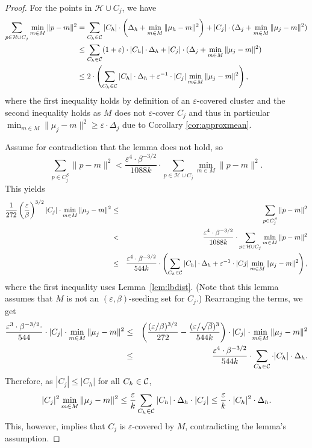 \documentclass[11pt]{article}
\begin{document}
\begin{proof}
For the points in $\mathcal{H}\cup C_j$, we have 
\begin{align*}
\label{eq:sample1}
  \sum_{p\in \mathcal{H}\cup C_j}\min_{m\in M}\|p-m\|^2 & = \sum_{C_h\in \cal C}  |C_h| \cdot \left(\Delta_h + \min_{m\in M}\|\mu_h - m\|^2\right) + |C_j|\cdot(\Delta_j + \min_{m\in M}\|\mu_j-m\|^2) \\
  &\leq \sum_{C_h\in \cal C} (1+\varepsilon) \cdot |C_h|\cdot\Delta_h + |C_j|\cdot(\Delta_j + \min_{m\in M}\|\mu_j-m\|^2) \\
  &\leq  2\cdot \left(\sum_{C_h\in \cal C} |C_h|\cdot\Delta_h  +\varepsilon^{-1}\cdot |C_j| \min_{m\in M}\|\mu_j-m\|^2\right),
\end{align*}
where the first inequality holds by definition of an $\varepsilon$-covered cluster and the second inequality holds as $M$ does not $\varepsilon$-cover $C_j$ and thus in particular $\min_{m\in M}\|\mu_j-m\|^2 \geq \varepsilon\cdot \Delta_j$ due to Corollary \ref{cor:approxmean}.

Assume for contradiction that the lemma does not hold, so
$$
\sum_{p\in C_j^\beta}\|p-m\|^2 <  \frac{\varepsilon^4 \cdot \beta^{-3/2}}{1088k}\cdot \sum_{p\in \mathcal{H}\cup C_j}\min_{m\in M}\|p-m\|^2.
$$
This yields
\begin{eqnarray*}
\frac{1}{272}\left(\frac{\varepsilon}{\beta}\right)^{3/2} |C_j| \cdot \min_{m\in M}\|\mu_j-m\|^2
&\le& \sum_{p\in C_j^\beta}\|p-m\|^2 \\
& < & \frac{\varepsilon^4 \cdot \beta^{-3/2}}{1088k}\cdot \sum_{p\in \mathcal{H}\cup C_j}\min_{m\in M}\|p-m\|^2\\
&\le&  \frac{\varepsilon^4 \cdot \beta^{-3/2}}{544 k}\cdot \left(\sum_{C_h\in \cal C}  |C_h|\cdot\Delta_h  +\varepsilon^{-1}\cdot |Cj| \min_{m\in M}\|\mu_j-m\|^2\right), \\
\end{eqnarray*}
where the first inequality uses Lemma~\ref{lem:lbdist}. (Note that this lemma assumes that $M$
is not an $(\varepsilon,\beta)$-seeding set for $C_j$.) Rearranging the terms, we get
\begin{eqnarray*}
\frac{\varepsilon^3\cdot \beta^{-3/2}\cdot}{544}\cdot |C_j|\cdot\min_{m\in M}\|\mu_j-m\|^2
&\le&\left(\frac{(\varepsilon/\beta)^{3/2}}{272}-\frac{(\varepsilon/\sqrt{\beta})^{3}}{544k}\right)\cdot|C_j|\cdot\min_{m\in M}\|\mu_j-m\|^2 \\
&\leq& \frac{\varepsilon^4 \cdot \beta^{-3/2}}{544k}\cdot \sum_{C_h\in \cal C}\cdot  |C_h|\cdot\Delta_h.
\end{eqnarray*}
Therefore, as $|C_j|\leq |C_h|$ for all $C_h\in {\cal C}$,
$$
|C_j|^2 \min_{m\in M}\|\mu_j-m\|^2 \leq \frac{\varepsilon}{k} \sum_{C_h\in \cal C}  |C_h|\cdot\Delta_h \cdot |C_j| \leq \frac{\varepsilon}{k}\cdot |C_h|^2\cdot\Delta_h.
$$
This, however, implies that $C_j$ is $\varepsilon$-covered by $M$, contradicting the lemma's assumption.
\end{proof}
\end{document}
